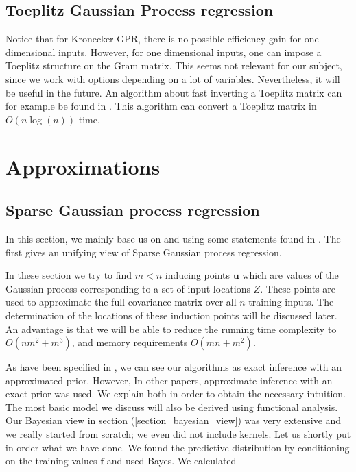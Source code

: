 \documentclass[12pt,a4paper,oneside]{book}
\begin{document}
\section{Toeplitz Gaussian Process regression}

Notice that for Kronecker GPR, there is no possible efficiency gain for one dimensional inputs. However, for one dimensional inputs, one can impose a Toeplitz structure on the Gram matrix. This seems not relevant for our subject, since we work with options depending on a lot of variables. Nevertheless, it will be useful in the future. An algorithm about fast inverting a Toeplitz matrix can for example be found in \cite{chan1994circulant}. This algorithm can convert a Toeplitz matrix in $O(n \log{ (n)})$ time.


\chapter{Approximations}

\section{Sparse Gaussian process regression}


In this section, we mainly base us on \cite{quinonero2005unifying} and  \cite{snelson2006sparse} using some statements found in \cite{GPRbook}. The first gives an unifying view of Sparse Gaussian process regression.

In these section we try to find $m < n$ inducing points $\bm{u}$ which are values of the Gaussian process corresponding to a set of input locations $Z$. These points are used to approximate the full covariance matrix over all $n$ training inputs. The determination of the locations of these induction points will be discussed later. An advantage is that we will be able to reduce the running time complexity to $O(nm^2+ m^3)$, and memory requirements $O(mn+m^2)$. 

As have been specified in \cite{quinonero2005unifying}, we can see our algorithms as exact inference with an approximated prior. However, In other papers, approximate inference with an exact prior was used. We explain both in order to obtain the necessary intuition. The most basic model we discuss will also be derived using functional analysis. Our Bayesian view in section (\ref{section_bayesian_view}) was very extensive and we really started from scratch; we even did not include kernels. Let us shortly put in order what we have done. We found the predictive distribution by conditioning on the training values $\bm{f}$ and used Bayes. We calculated
\end{document}

